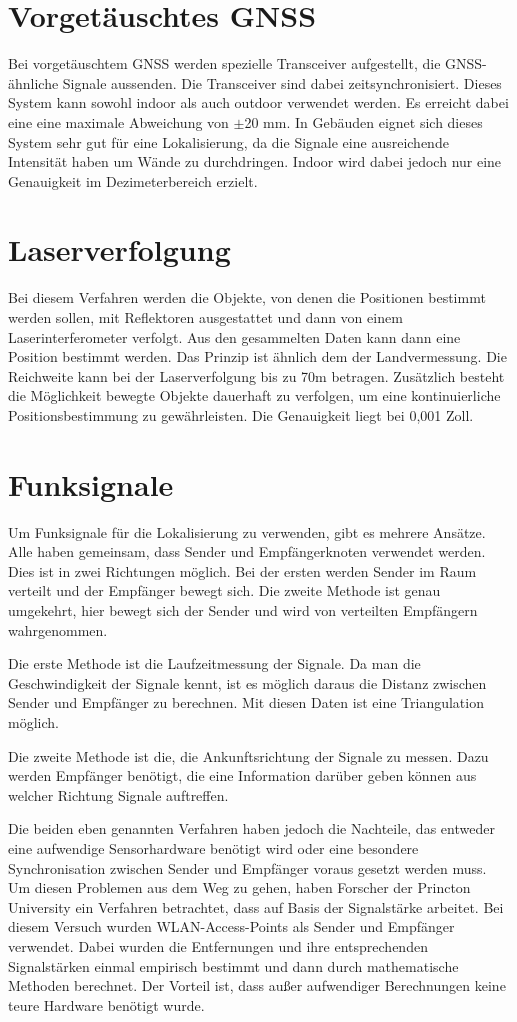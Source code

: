 \section{Vorgetäuschtes GNSS}
Bei vorgetäuschtem GNSS werden spezielle Transceiver aufgestellt, die
GNSS-ähnliche Signale aussenden. Die Transceiver sind dabei
zeitsynchronisiert. Dieses System kann sowohl indoor als auch outdoor
verwendet werden. Es erreicht dabei eine eine maximale Abweichung von
$\pm$20 mm. In Gebäuden eignet sich dieses System sehr gut für eine
Lokalisierung, da die Signale eine ausreichende Intensität haben um Wände
zu durchdringen. Indoor wird dabei jedoch nur eine Genauigkeit im
Dezimeterbereich erzielt.

\section{Laserverfolgung}
Bei diesem Verfahren werden die Objekte, von denen die Positionen
bestimmt werden sollen, mit Reflektoren ausgestattet und dann von einem
Laserinterferometer verfolgt. Aus den gesammelten Daten kann dann eine
Position bestimmt werden. Das Prinzip ist ähnlich dem der Landvermessung.
Die Reichweite kann bei der Laserverfolgung bis zu 70m betragen. Zusätzlich
besteht die Möglichkeit bewegte Objekte dauerhaft zu verfolgen, um eine
kontinuierliche Positionsbestimmung zu gewährleisten. Die Genauigkeit liegt
bei 0,001 Zoll.

\section{Funksignale}
Um Funksignale für die Lokalisierung zu verwenden, gibt es mehrere Ansätze.
Alle haben gemeinsam, dass Sender und Empfängerknoten verwendet werden. Dies
ist in zwei Richtungen möglich. Bei der ersten werden Sender im Raum verteilt
und der Empfänger bewegt sich. Die zweite Methode ist genau umgekehrt, hier
bewegt sich der Sender und wird von verteilten Empfängern wahrgenommen.

Die erste Methode ist die Laufzeitmessung der Signale. Da man die
Geschwindigkeit der Signale kennt, ist es möglich daraus die Distanz zwischen
Sender und Empfänger zu berechnen. Mit diesen Daten ist eine Triangulation
möglich.

Die zweite Methode ist die, die Ankunftsrichtung der Signale zu messen. Dazu werden
Empfänger benötigt, die eine Information darüber geben können aus welcher
Richtung Signale auftreffen.

Die beiden eben genannten Verfahren haben jedoch die Nachteile, das entweder
eine aufwendige Sensorhardware benötigt wird oder eine besondere Synchronisation
zwischen Sender und Empfänger voraus gesetzt werden muss. Um diesen Problemen
aus dem Weg zu gehen, haben Forscher der Princton University ein Verfahren
betrachtet, dass auf Basis der Signalstärke arbeitet. Bei diesem Versuch
wurden WLAN-Access-Points als Sender und Empfänger verwendet. Dabei wurden
die Entfernungen und ihre entsprechenden Signalstärken einmal empirisch
bestimmt und dann durch mathematische Methoden berechnet. Der Vorteil ist,
dass außer aufwendiger Berechnungen keine teure Hardware benötigt wurde.

\cleardoublepage
